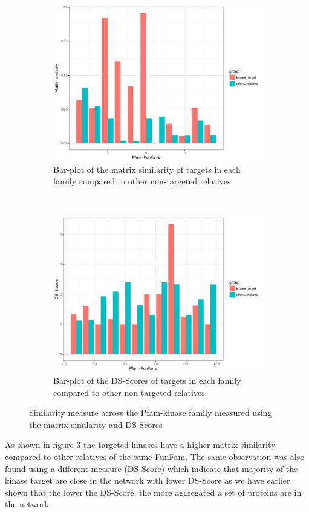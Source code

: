 \documentclass[a4paper, 11pt]{article}
\begin{document}
\begin{figure}[H]
\centering
\begin{subfigure}{0.8\textwidth}
  \centering
  \includegraphics[width=0.9\linewidth]{figures/pfam_sim0910.pdf}
  \caption{Bar-plot of the matrix similarity of targets in each family compared to other non-targeted relatives}
  \label{sim_plot}
\end{subfigure}\\
\begin{subfigure}{0.8\textwidth}
  \includegraphics[width=0.9\linewidth]{figures/pfamds_plot.pdf}
	\centering
	\caption{Bar-plot of the DS-Scores of targets in each family compared to other non-targeted relatives}
	\label{ds_plot}
\end{subfigure}
\caption{Similarity measure across the Pfam-kinase family measured using the matrix similarity and DS-Scores}
\label{pfam_sim}
\end{figure}
As shown in figure \ref{pfam_sim} the targeted kinases have a higher matrix similarity compared to other relatives of the same FunFam. The same observation was also found using a different measure (DS-Score) which indicate that majority of the kinase target are close in the network with lower DS-Score as we have earlier shown that the lower the DS-Score, the more aggregated a set of proteins are in the network  \cite{menche2015uncovering}
\end{document}

